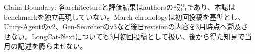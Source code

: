 \begin{claimboundary}
Claim Boundary: 各architectureと評価結果はauthorsの報告であり、本誌はbenchmarkを独立再現していない。March chronologyは初回投稿を基準とし、Unify-Agentのv2、Gen-Searcherのv3など後日revisionの内容を3月時点へ遡及させない。LongCat-Nextについても3月初回投稿として扱い、後から得た知見で当月の記述を膨らませない。\autocite{src-197775677c0d,src-abece2adf5a7,src-ac36472a8f09,src-b8369fd2c988}
\end{claimboundary}
